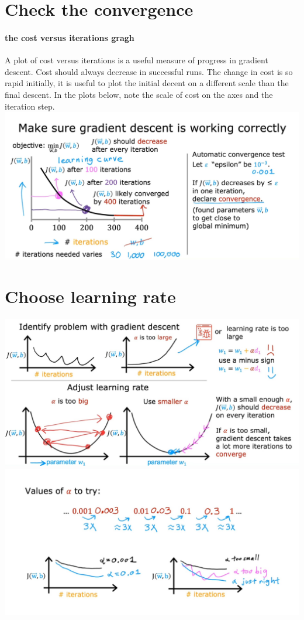 \section{Check the convergence}
\paragraph*{the cost versus iterations gragh}
A plot of cost versus iterations is a useful measure of 
progress in gradient descent. Cost should always decrease 
in successful runs. The change in cost is so rapid initially, 
it is useful to plot the initial decent on a different scale than the final descent. 
In the plots below, note the scale of cost on the axes and the iteration step.\\
\includegraphics*[width=\textwidth]{images/2.4 (3)}

\section{Choose learning rate}
\noindent
\includegraphics*[width=\textwidth]{images/2.4 (2)}
\noindent
\includegraphics*[width=\textwidth]{images/2.4}

